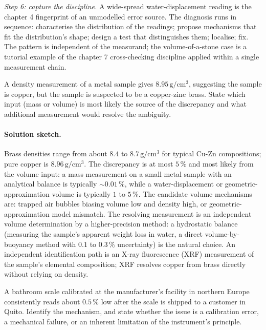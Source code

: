\emph{Step 6: capture the discipline.}
A wide-spread water-displacement reading is the chapter 4
fingerprint of an unmodelled error source. The diagnosis runs in
sequence: characterise the distribution of the readings; propose
mechanisms that fit the distribution's shape; design a test that
distinguishes them; localise; fix. The pattern is independent of
the measurand; the volume-of-a-stone case is a tutorial example
of the chapter 7 cross-checking discipline applied within a
single measurement chain.

\begin{exercise}
A density measurement of a metal sample gives
$8.95 \,\si{\gram\per\centi\meter\cubed}$, suggesting the sample is
copper, but the sample is suspected to be a copper-zinc brass.
State which input (mass or volume) is most likely the source of the
discrepancy and what additional measurement would resolve the
ambiguity.
\end{exercise}

\paragraph{Solution sketch.}
Brass densities range from about $8.4$ to $8.7 \,\si{\gram\per
\centi\meter\cubed}$ for typical Cu-Zn compositions; pure copper is
$8.96 \,\si{\gram\per\centi\meter\cubed}$. The discrepancy is at
most $5\,\%$ and most likely from the volume input: a mass
measurement on a small metal sample with an analytical balance is
typically $\sim 0.01\,\%$, while a water-displacement or
geometric-approximation volume is typically $1$ to $5\,\%$. The
candidate volume mechanisms are: trapped air bubbles biasing
volume low and density high, or geometric-approximation model
mismatch. The resolving measurement is an independent volume
determination by a higher-precision method: a hydrostatic balance
(measuring the sample's apparent weight loss in water, a direct
volume-by-buoyancy method with $0.1$ to $0.3\,\%$ uncertainty) is
the natural choice. An independent identification path is an X-ray
fluorescence (XRF) measurement of the sample's elemental
composition; XRF resolves copper from brass directly without
relying on density.

\begin{exercise}
A bathroom scale calibrated at the manufacturer's facility in
northern Europe consistently reads about $0.5\,\%$ low after the
scale is shipped to a customer in Quito. Identify the mechanism, and
state whether the issue is a calibration error, a mechanical
failure, or an inherent limitation of the instrument's principle.
\end{exercise}

